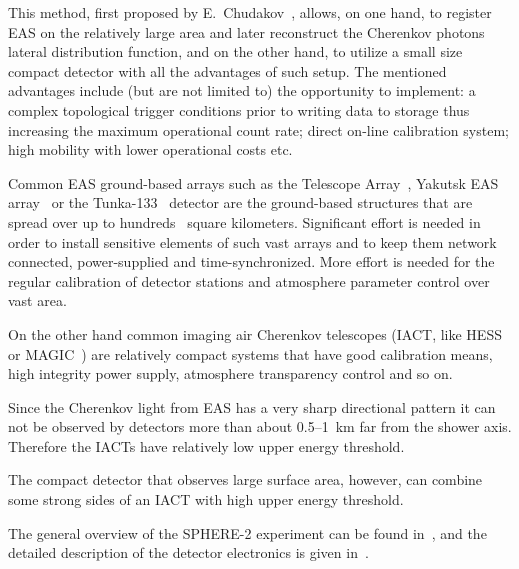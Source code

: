 \documentclass[final,5p,times,twocolumn]{elsarticle}
\begin{document}
This method, first proposed by E.~Chudakov~\cite{chu74}, allows, on one hand, to register EAS on the relatively large area and later reconstruct the Cherenkov photons lateral distribution function, and on the other hand, to utilize a small size compact detector with all the advantages of such setup. The mentioned advantages include (but are not limited to) the opportunity to implement: a complex topological trigger conditions prior to writing data to storage thus increasing the maximum operational count rate; direct on-line calibration system; high mobility with lower operational costs etc.

Common EAS ground-based arrays such as the Telescope Array~\cite{abu12}, Yakutsk EAS array~\cite{} or the Tunka-133~\cite{} detector are the ground-based structures that are spread over up to hundreds~\cite{abu12} square kilometers. Significant effort is needed in order to install sensitive elements of such vast arrays and to keep them network connected, power-supplied and time-synchronized. More effort is needed for the regular calibration of detector stations and atmosphere parameter control over vast area. 

On the other hand common imaging air Cherenkov telescopes (IACT, like HESS~\cite{} or MAGIC~\cite{}) are relatively compact systems that have good calibration means, high integrity power supply, atmosphere transparency control and so on.

Since the Cherenkov light from EAS has a very sharp directional pattern it can not be observed by detectors more than about 0.5--1~km far from the shower axis. Therefore the IACTs have relatively low upper energy threshold.

The compact detector that observes large surface area, however, can combine some strong sides of an IACT with high upper energy threshold. 

The general overview of the SPHERE-2 experiment can be found in~\cite{Ant15a}, and the detailed description of the detector electronics is given in~\cite{Ant20}.
\end{document}
